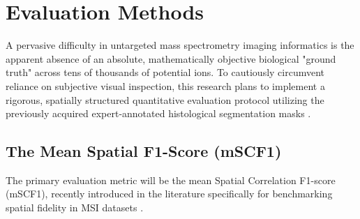 \documentclass[
12pt, %
oneside, %
english, %
onehalfspacing, %
nolistspacing, %
headsepline, %
]{MastersDoctoralThesis} %
\begin{document}

\section{Evaluation Methods}
A pervasive difficulty in untargeted mass spectrometry imaging informatics is the apparent absence of an absolute, mathematically objective biological "ground truth" across tens of thousands of potential ions. To cautiously circumvent reliance on subjective visual inspection, this research plans to implement a rigorous, spatially structured quantitative evaluation protocol utilizing the previously acquired expert-annotated histological segmentation masks \citep{weigand2026spatial}.

\subsection{The Mean Spatial F1-Score (mSCF1)}
The primary evaluation metric will be the mean Spatial Correlation F1-score (mSCF1), recently introduced in the literature specifically for benchmarking spatial fidelity in MSI datasets \citep{weigand2026spatial}.
\end{document}

